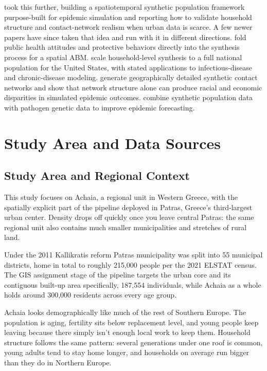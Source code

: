 \documentclass{article}
\begin{document}
\citet{Zhu2024} took this further, building a spatiotemporal synthetic population framework purpose-built for epidemic simulation and reporting how to validate household structure and contact-network realism when urban data is scarce. A few newer papers have since taken that idea and run with it in different directions. \citet{VonHoene2025PublicHealth} fold public health attitudes and protective behaviors directly into the synthesis process for a spatial ABM. \citet{Rineer2025USPop} scale household-level synthesis to a full national population for the United States, with stated applications to infectious-disease and chronic-disease modeling. \citet{Tulchinsky2026ContactNetworks} generate geographically detailed synthetic contact networks and show that network structure alone can produce racial and economic disparities in simulated epidemic outcomes. \citet{Osthus2026SyntheticGenetic} combine synthetic population data with pathogen genetic data to improve epidemic forecasting.

\section{Study Area and Data Sources}\label{study-area-and-data-sources}

\subsection{Study Area and Regional Context}\label{study-area-and-regional-context}

This study focuses on Achaia, a regional unit in Western Greece, with the spatially explicit part of the pipeline deployed in Patras, Greece's third-largest urban center. Density drops off quickly once you leave central Patras: the same regional unit also contains much smaller municipalities and stretches of rural land.

Under the 2011 Kallikratis reform Patras municipality was split into 55 municipal districts, home in total to roughly 215,000 people per the 2021 ELSTAT census. The GIS assignment stage of the pipeline targets the urban core and its contiguous built-up area specifically, 187,554 individuals, while Achaia as a whole holds around 300,000 residents across every age group.

Achaia looks demographically like much of the rest of Southern Europe. The population is aging, fertility sits below replacement level, and young people keep leaving because there simply isn't enough local work to keep them. Household structure follows the same pattern: several generations under one roof is common, young adults tend to stay home longer, and households on average run bigger than they do in Northern Europe.
\end{document}
